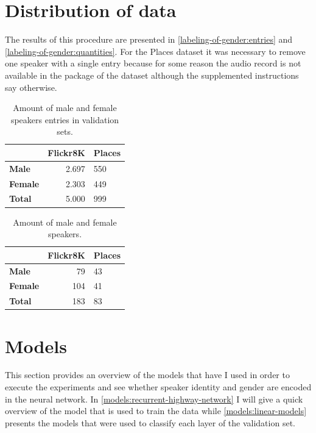 \documentclass[a4paper, oneside]{book}
\begin{document}
\section{Distribution of data}\label{methods-and-datasets:distribution-of-data}

The results of this procedure are presented in \autoref{labeling-of-gender:entries} and \autoref{labeling-of-gender:quantities}. For the Places dataset it was necessary to remove one speaker with a single entry because for some reason the audio record is not available in the package of the dataset \cite{harwath2016unsupervised} although the supplemented instructions say otherwise.

\begin{table}[H]
\begin{center}
\begin{tabular}{|l|rl|}
\hline      & \bf Flickr8K  & \bf Places \\ \hline
\bf Male    & 2.697         & 550 \\
\bf Female  & 2.303         & 449 \\ \hline
\bf Total   & 5.000         & 999 \\
\hline
\end{tabular}
\end{center}
\caption{\label{labeling-of-gender:entries} Amount of male and female speakers entries in validation sets.  }
\end{table}

\begin{table}[H]
\begin{center}
\begin{tabular}{|l|rl|}
\hline      & \bf Flickr8K  & \bf Places \\ \hline
\bf Male    & 79            & 43 \\
\bf Female  & 104           & 41 \\ \hline
\bf Total   & 183           & 83 \\
\hline
\end{tabular}
\end{center}
\caption{\label{labeling-of-gender:quantities} Amount of male and female speakers.  }
\end{table}

\section{Models}\label{methods-and-datasets:models}

This section provides an overview of the models that have I used in order to execute the experiments and see whether speaker identity and gender are encoded in the neural network. In \autoref{models:recurrent-highway-network} I will give a quick overview of the model that is used to train the data while \autoref{models:linear-models} presents the models that were used to classify each layer of the validation set.
\end{document}
